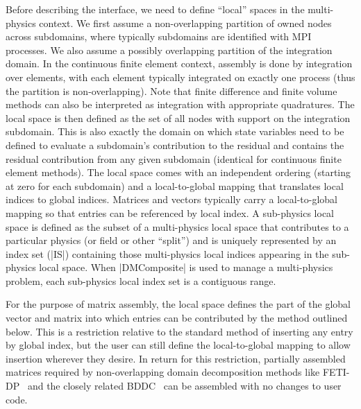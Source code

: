 Before describing the interface, we need to define ``local'' spaces in the multi-physics context.
We first assume a non-overlapping partition of owned nodes across subdomains, where typically subdomains are identified with MPI processes.
We also assume a possibly overlapping partition of the integration domain.
In the continuous finite element context, assembly is done by integration over elements, with each element typically integrated on exactly one process (thus the partition is non-overlapping).
Note that finite difference and finite volume methods can also be interpreted as integration with appropriate quadratures.
The local space is then defined as the set of all nodes with support on the integration subdomain.
This is also exactly the domain on which state variables need to be defined to evaluate a subdomain's contribution to the residual and contains the residual contribution from any given subdomain (identical for continuous finite element methods).
The local space comes with an independent ordering (starting at zero for each subdomain) and a local-to-global mapping that translates local indices to global indices.
Matrices and vectors typically carry a local-to-global mapping so that entries can be referenced by local index.
A sub-physics local space is defined as the subset of a multi-physics local space that contributes to a particular physics (or field or other ``split'') and is uniquely represented by an index set (\cverb|IS|) containing those multi-physics local indices appearing in the sub-physics local space.
When \cverb|DMComposite| is used to manage a multi-physics problem, each sub-physics local index set is a contiguous range.

For the purpose of matrix assembly, the local space defines the part of the global vector and matrix into which entries can be contributed by the method outlined below.
This is a restriction relative to the standard method of inserting any entry by global index, but the user can still define the local-to-global mapping to allow insertion wherever they desire.
In return for this restriction, partially assembled matrices required by non-overlapping domain decomposition methods like FETI-DP~\citep{farhat2001feti,farhat2000scalable,klawonn2006dual,klawonn2007robust,klawonn2007inexact} and the closely related BDDC~\citep{dohrmann2003psb,mandel2003cbd,li2006bddc} can be assembled with no changes to user code.

